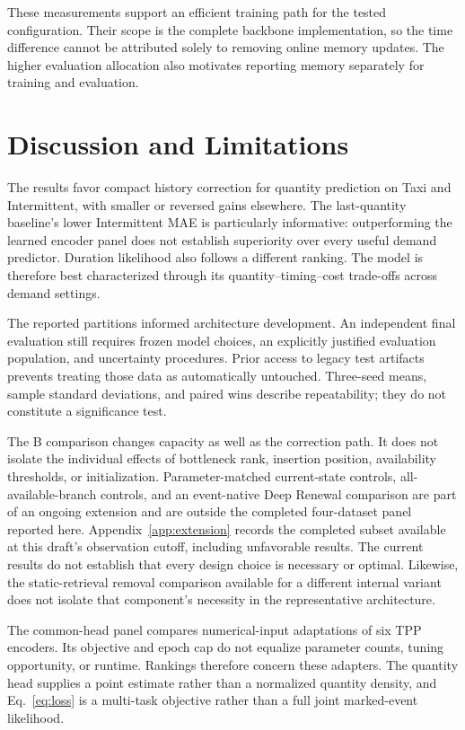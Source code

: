 \documentclass[runningheads]{llncs}
\begin{document}
These measurements support an efficient training path for the tested
configuration. Their scope is the complete backbone implementation, so the
time difference cannot be attributed solely to removing online memory
updates. The higher evaluation allocation also motivates reporting memory
separately for training and evaluation.

\section{Discussion and Limitations}\label{sec:limitations}
The results favor compact history correction for quantity prediction on Taxi
and Intermittent, with smaller or reversed gains elsewhere. The last-quantity
baseline's lower Intermittent MAE is particularly informative: outperforming
the learned encoder panel does not establish superiority over every useful
demand predictor. Duration likelihood also follows a different ranking.
The model is therefore best characterized through its quantity--timing--cost
trade-offs across demand settings.

The reported partitions informed architecture development. An independent
final evaluation still requires frozen model choices, an explicitly justified
evaluation population, and uncertainty procedures. Prior access to legacy
test artifacts prevents treating those data as automatically untouched.
Three-seed means, sample standard deviations, and paired wins describe
repeatability; they do not constitute a significance test.

The B comparison changes capacity as well as the correction path. It does
not isolate the individual effects of bottleneck rank, insertion position,
availability thresholds, or initialization. Parameter-matched current-state
controls, all-available-branch controls, and an event-native Deep Renewal
comparison are part of an ongoing extension and are outside the completed
four-dataset panel reported here. Appendix~\ref{app:extension} records the
completed subset available at this draft's observation cutoff, including
unfavorable results. The current results do not establish that
every design choice is necessary or optimal. Likewise, the static-retrieval
removal comparison available for a different internal variant does not
isolate that component's necessity in the representative architecture.

The common-head panel compares numerical-input adaptations of six TPP
encoders. Its objective and epoch cap do not equalize parameter counts,
tuning opportunity, or runtime. Rankings therefore concern these adapters.
The quantity head supplies a point estimate rather than a normalized quantity
density, and Eq.~\eqref{eq:loss} is a multi-task objective rather than a full
joint marked-event likelihood.
\end{document}
